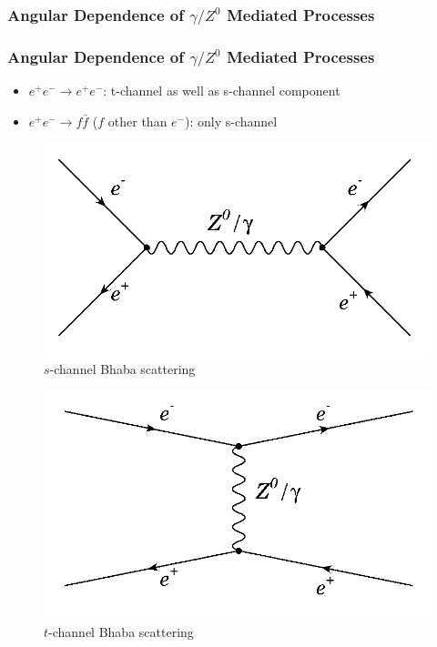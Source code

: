 \documentclass[10pt]{beamer}
\begin{document}
\subsubsection{Angular Dependence of $\gamma / Z^{0}$ Mediated Processes}
\begin{frame}
\frametitle{Angular Dependence of $\gamma / Z^{0}$ Mediated Processes}
\begin{minipage}{0.5\textwidth}
\begin{itemize}
\item $e^{+}e^{-}\rightarrow e^{+}e^{-}$: t-channel as well as s-channel component
\item $e^{+}e^{-}\rightarrow f\bar{f}$ ($f$ other than $e^{-}$): only s-channel
\end{itemize}
\end{minipage}\hspace{2em}
\begin{minipage}{0.35\textwidth}
      \begin{figure}
      \centering
        \includegraphics[width=\textwidth]{bhabha-s}
        \caption{$s$-channel Bhaba scattering}
      \end{figure}
      \begin{figure}
      \centering
        \includegraphics[width=\textwidth]{bhabha-t}
        \caption{$t$-channel Bhaba scattering}
      \end{figure}
  \end{minipage}\hfill
\end{frame}
\end{document}
